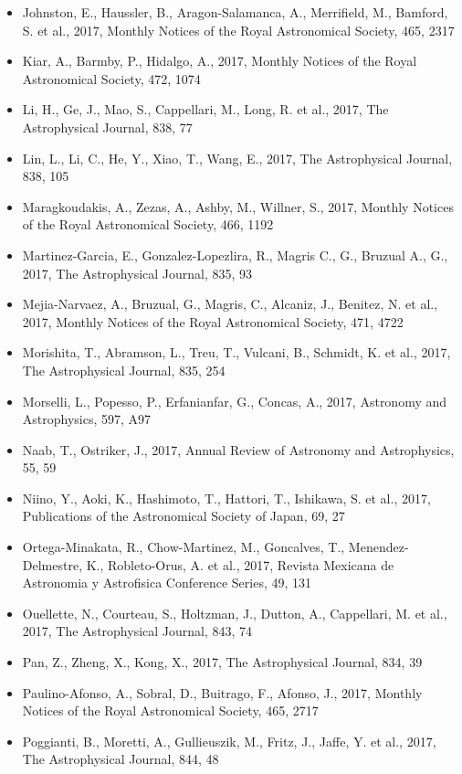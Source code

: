 \documentclass{letter}
\begin{document}
\begin{enumerate}
\begin{itemize}
\item Johnston, E., Haussler, B., Aragon-Salamanca, A., Merrifield, M., Bamford, S. et al., 2017, Monthly Notices of the Royal Astronomical Society, 465, 2317
\item Kiar, A., Barmby, P., Hidalgo, A., 2017, Monthly Notices of the Royal Astronomical Society, 472, 1074
\item Li, H., Ge, J., Mao, S., Cappellari, M., Long, R. et al., 2017, The Astrophysical Journal, 838, 77
\item Lin, L., Li, C., He, Y., Xiao, T., Wang, E., 2017, The Astrophysical Journal, 838, 105
\item Maragkoudakis, A., Zezas, A., Ashby, M., Willner, S., 2017, Monthly Notices of the Royal Astronomical Society, 466, 1192
\item Martinez-Garcia, E., Gonzalez-Lopezlira, R., Magris C., G., Bruzual A., G., 2017, The Astrophysical Journal, 835, 93
\item Mejia-Narvaez, A., Bruzual, G., Magris, C., Alcaniz, J., Benitez, N. et al., 2017, Monthly Notices of the Royal Astronomical Society, 471, 4722
\item Morishita, T., Abramson, L., Treu, T., Vulcani, B., Schmidt, K. et al., 2017, The Astrophysical Journal, 835, 254
\item Morselli, L., Popesso, P., Erfanianfar, G., Concas, A., 2017, Astronomy and Astrophysics, 597, A97
\item Naab, T., Ostriker, J., 2017, Annual Review of Astronomy and Astrophysics, 55, 59
\item Niino, Y., Aoki, K., Hashimoto, T., Hattori, T., Ishikawa, S. et al., 2017, Publications of the Astronomical Society of Japan, 69, 27
\item Ortega-Minakata, R., Chow-Martinez, M., Goncalves, T., Menendez-Delmestre, K., Robleto-Orus, A. et al., 2017, Revista Mexicana de Astronomia y Astrofisica Conference Series, 49, 131
\item Ouellette, N., Courteau, S., Holtzman, J., Dutton, A., Cappellari, M. et al., 2017, The Astrophysical Journal, 843, 74
\item Pan, Z., Zheng, X., Kong, X., 2017, The Astrophysical Journal, 834, 39
\item Paulino-Afonso, A., Sobral, D., Buitrago, F., Afonso, J., 2017, Monthly Notices of the Royal Astronomical Society, 465, 2717
\item Poggianti, B., Moretti, A., Gullieuszik, M., Fritz, J., Jaffe, Y. et al., 2017, The Astrophysical Journal, 844, 48

\end{itemize}
\end{enumerate}
\end{document}
